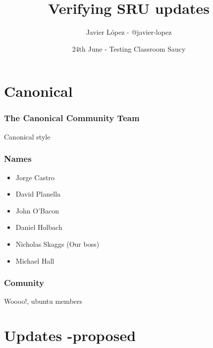 \documentclass[dvipsnames]{beamer}
\title{Verifying SRU updates}
\author[Javier López]{Javier López - @javier-lopez}
\institute[Testing Classroom Saucy]
{\url{https://wiki.ubuntu.com/Testing/Activities/Classroom/Saucy}}
\date[2013]
     {24th June - Testing Classroom Saucy}
\begin{document}
\begin{frame}
  \titlepage
\end{frame}

\section[Sponsor]{Canonical}

\begin{frame}
    \frametitle{The Canonical Community Team}
  \begin{center}
  \end{center}
  \begin{center}
    Canonical style
  \end{center}
\end{frame}

\begin{frame}
  \frametitle{Names}
  \begin{itemize}
  \item Jorge Castro
  \item David Planella
  \item John O'Bacon
  \item Daniel Holbach
  \item Nicholas Skaggs (Our boss)
  \item Michael Hall
  \end{itemize}
\end{frame}

\begin{frame}
  \frametitle{Comunity}
  \begin{center}
  \end{center}
  \begin{center}
    Woooo!, ubuntu members
  \end{center}
\end{frame}

\section[-proposed]{Updates -proposed}
\end{document}

